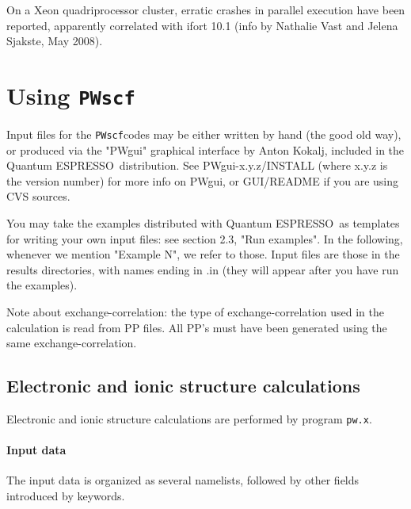 \documentclass[12pt,a4paper]{article}
\def\qe{{\sc Quantum ESPRESSO}}
\def\pw.x{\texttt{pw.x}}
\def\PWscf{\texttt{PWscf}}
\begin{document}
On a Xeon quadriprocessor cluster, erratic crashes in parallel
execution have been reported, apparently correlated with ifort 10.1
(info by Nathalie Vast and Jelena Sjakste, May 2008).

\section{Using \PWscf}

Input files for the \PWscf codes may be either written by hand (the good old
way), or produced via the "PWgui" graphical interface by Anton Kokalj, 
included in the \qe\ distribution. See PWgui-x.y.z/INSTALL
(where x.y.z is the version number) for more info on PWgui, or GUI/README
if you are using CVS sources.
    
You may take the examples distributed with \qe\ as
templates for writing your own input files: see section 2.3, "Run examples".
In the following, whenever we mention "Example N", we refer to those. Input
files are those in the results directories, with names ending in .in 
(they will appear after you have run the examples).
    
Note about exchange-correlation: the type of exchange-correlation used
in the calculation is read from PP files. All PP's must have been generated
using the same exchange-correlation.

\subsection{Electronic and ionic structure calculations}

Electronic and ionic structure calculations are performed by program \pw.x.

\paragraph{Input data}

The input data is organized as several namelists, followed by other fields
introduced by keywords.
    
\end{document}
